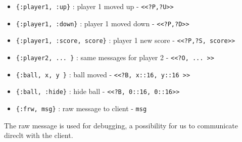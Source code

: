 \documentclass[a4paper,11pt]{article}
\begin{document}
\begin{itemize}
\item {\tt \{:player1, :up\}}  : player 1 moved up -  {\tt <<?P,?U>>}
\item {\tt \{:player1, :down\}}  : player 1 moved down - {\tt <<?P,?D>>}
\item {\tt \{:player1, :score, score\}}  : player 1 new score - {\tt <<?P,?S, score>>}
\item {\tt \{:player2, ... \}} : same messages for player 2 -  {\tt <<?O, ... >>}        
\item {\tt \{:ball, x, y \}} : ball moved  - {\tt <<?B, x::16, y::16 >>}        
\item {\tt \{:ball, :hide\}} : hide ball - {\tt <<?B, 0::16, 0::16>>}        
\item {\tt \{:frw, msg\}}  : raw message to client - {\tt msg}
\end{itemize}

The raw message is used for debugging, a possibility for us to
communicate direclt with the client.
\end{document}
